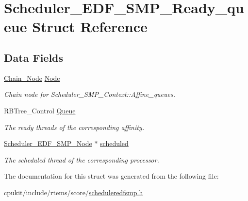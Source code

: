 \hypertarget{structScheduler__EDF__SMP__Ready__queue}{}\section{Scheduler\+\_\+\+E\+D\+F\+\_\+\+S\+M\+P\+\_\+\+Ready\+\_\+queue Struct Reference}
\label{structScheduler__EDF__SMP__Ready__queue}
\subsection*{Data Fields}
\begin{DoxyCompactItemize}
\item 
\mbox{\label{structScheduler__EDF__SMP__Ready__queue_ad46fef65795dd96a33972e348d8b2c5f}} 
\mbox{\hyperlink{group__RTEMSScoreChain_ga0dd4bfcca1ac7f90de2842e447846d3d}{Chain\+\_\+\+Node}} \mbox{\hyperlink{structScheduler__EDF__SMP__Ready__queue_ad46fef65795dd96a33972e348d8b2c5f}{Node}}
\begin{DoxyCompactList}\small\item\em Chain node for Scheduler\+\_\+\+S\+M\+P\+\_\+\+Context\+::\+Affine\+\_\+queues. \end{DoxyCompactList}\item 
\mbox{\label{structScheduler__EDF__SMP__Ready__queue_a0898c1c63589a24d479b2ed80be385e9}} 
R\+B\+Tree\+\_\+\+Control \mbox{\hyperlink{structScheduler__EDF__SMP__Ready__queue_a0898c1c63589a24d479b2ed80be385e9}{Queue}}
\begin{DoxyCompactList}\small\item\em The ready threads of the corresponding affinity. \end{DoxyCompactList}\item 
\mbox{\label{structScheduler__EDF__SMP__Ready__queue_a4b5a492142593b8444b58d6bd98a5aa7}} 
\mbox{\hyperlink{structScheduler__EDF__SMP__Node}{Scheduler\+\_\+\+E\+D\+F\+\_\+\+S\+M\+P\+\_\+\+Node}} $\ast$ \mbox{\hyperlink{structScheduler__EDF__SMP__Ready__queue_a4b5a492142593b8444b58d6bd98a5aa7}{scheduled}}
\begin{DoxyCompactList}\small\item\em The scheduled thread of the corresponding processor. \end{DoxyCompactList}\end{DoxyCompactItemize}


The documentation for this struct was generated from the following file\+:\begin{DoxyCompactItemize}
\item 
cpukit/include/rtems/score/\mbox{\hyperlink{scheduleredfsmp_8h}{scheduleredfsmp.\+h}}\end{DoxyCompactItemize}
